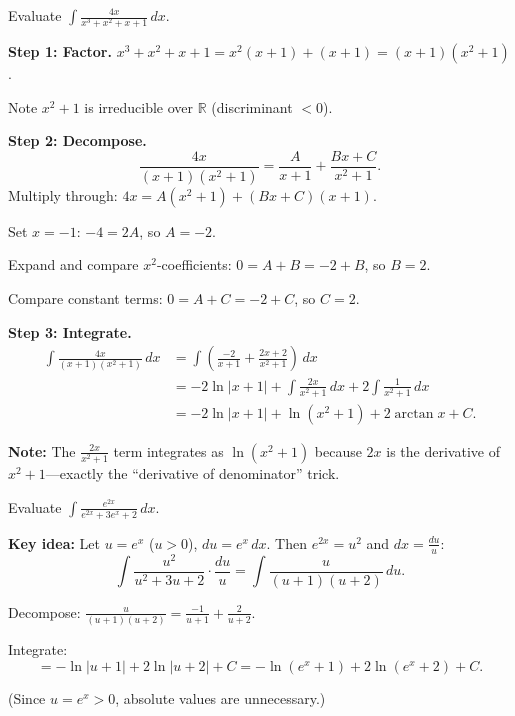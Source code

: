 \begin{examplebox}[title={Worked Example (Tutorial 6, Q1(b)): Irreducible quadratic in the denominator}]

Evaluate $\displaystyle \int \frac{4x}{x^3+x^2+x+1}\,dx$.

\textbf{Step 1: Factor.} $x^3+x^2+x+1 = x^2(x+1)+(x+1) = (x+1)(x^2+1)$.

Note $x^2+1$ is irreducible over $\mathbb{R}$ (discriminant $<0$).

\textbf{Step 2: Decompose.}
\[
\frac{4x}{(x+1)(x^2+1)} = \frac{A}{x+1}+\frac{Bx+C}{x^2+1}.
\]
Multiply through: $4x = A(x^2+1)+(Bx+C)(x+1)$.

Set $x=-1$: $-4=2A$, so $A=-2$.

Expand and compare $x^2$-coefficients: $0=A+B=-2+B$, so $B=2$.

Compare constant terms: $0=A+C=-2+C$, so $C=2$.

\textbf{Step 3: Integrate.}
\begin{align*}
\int \frac{4x}{(x+1)(x^2+1)}\,dx
&= \int\left(\frac{-2}{x+1}+\frac{2x+2}{x^2+1}\right)\,dx\\
&= -2\ln|x+1| + \int\frac{2x}{x^2+1}\,dx + 2\int\frac{1}{x^2+1}\,dx\\
&= -2\ln|x+1| + \ln(x^2+1) + 2\arctan x + C.
\end{align*}

\textbf{Note:} The $\frac{2x}{x^2+1}$ term integrates as $\ln(x^2+1)$ because $2x$ is the derivative of $x^2+1$---exactly the ``derivative of denominator'' trick.

\end{examplebox}

\begin{examplebox}[title={Worked Example (Tutorial 6, Q1(e)): Exponential rational integral}]

Evaluate $\displaystyle \int \frac{e^{2x}}{e^{2x}+3e^x+2}\,dx$.

\textbf{Key idea:} Let $u=e^x$ ($u>0$), $du=e^x\,dx$. Then $e^{2x}=u^2$ and $dx=\frac{du}{u}$:
\[
\int \frac{u^2}{u^2+3u+2}\cdot\frac{du}{u} = \int \frac{u}{(u+1)(u+2)}\,du.
\]

Decompose: $\frac{u}{(u+1)(u+2)}=\frac{-1}{u+1}+\frac{2}{u+2}$.

Integrate:
\[
= -\ln|u+1|+2\ln|u+2|+C = -\ln(e^x+1)+2\ln(e^x+2)+C.
\]

(Since $u=e^x>0$, absolute values are unnecessary.)

\end{examplebox}

